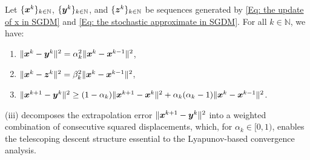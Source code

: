 \begin{proposition}
    \label{Pp: relations of xyz} Let $\{\bm{x}^{k}\}_{k \in \mathbb{N}}$,
    $\{\bm{y}^{k}\}_{k \in \mathbb{N}}$, and $\{\bm{z}^{k}\}_{k \in \mathbb{N}}$ be sequences
    generated by \eqref{Eq: the update of x in SGDM} and \eqref{Eq: the stochastic approximate in SGDM}. For all $k \in \mathbb{N}$,
    we have:
    \begin{enumerate}[label=(\roman{*})]
        \item $\|\bm{x}^{k}- \bm{y}^{k}\|^{2}= \alpha_{k}^{2}\|\bm{x}^{k}- \bm{x}^{k-1}\|^{2}$,

        \item $\|\bm{x}^{k}- \bm{z}^{k}\|^{2}= \beta_{k}^{2}\|\bm{x}^{k}- \bm{x}^{k-1}\|^{2}$,

        \item $\|\bm{x}^{k+1}- \bm{y}^{k}\|^{2}\geq (1 - \alpha_{k})\|\bm{x}^{k+1}- \bm{x}^{k}
            \|^{2}+ \alpha_{k}(\alpha_{k}- 1)\|\bm{x}^{k}- \bm{x}^{k-1}\|^{2}$.
    \end{enumerate}
\end{proposition}
(iii) decomposes the  extrapolation error $\|\bm{x}^{k+1} - \bm{y}^k\|^2$ into a weighted combination of consecutive squared displacements, which, for $\alpha_k \in [0,1)$, enables the telescoping descent 
structure essential to the Lyapunov-based convergence analysis.


